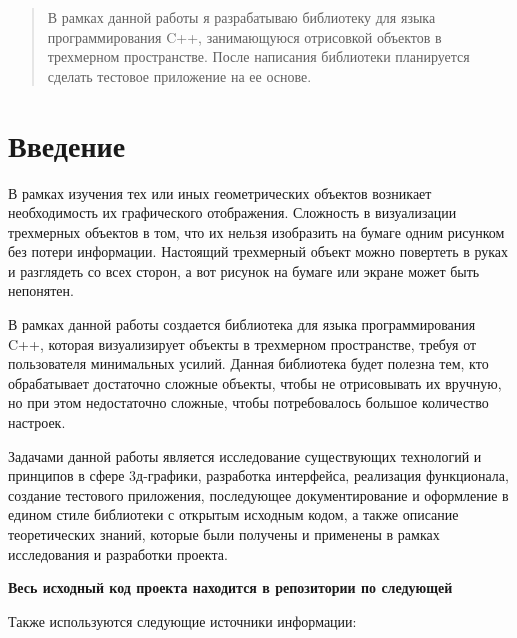 \documentclass{article}
\begin{document}
\makeTitlePage

\tableofcontents

\begin{abstract}
В рамках данной работы я разрабатываю библиотеку для языка программирования C++, занимающуюся отрисовкой объектов в трехмерном пространстве. После написания библиотеки планируется сделать тестовое приложение на ее основе.
\end{abstract}

\newpage

\section{Введение}

В рамках изучения тех или иных геометрических объектов возникает необходимость их графического отображения. Сложность в визуализации трехмерных объектов в том, что их нельзя изобразить на бумаге одним рисунком без потери информации. Настоящий трехмерный объект можно повертеть в руках и разглядеть со всех сторон, а вот рисунок на бумаге или экране может быть непонятен.

В рамках данной работы создается библиотека для языка программирования C++, которая визуализирует объекты в трехмерном пространстве, требуя от пользователя минимальных усилий. Данная библиотека будет полезна тем, кто обрабатывает достаточно сложные объекты, чтобы не отрисовывать их вручную, но при этом недостаточно сложные, чтобы потребовалось большое количество настроек.

Задачами данной работы является исследование существующих технологий и принципов в сфере 3д-графики, разработка интерфейса, реализация функционала, создание тестового приложения, последующее документирование и оформление в едином стиле библиотеки с открытым исходным кодом, а также описание теоретических знаний, которые были получены и применены в рамках исследования и разработки проекта.



\begin{center}\textbf{Весь исходный код проекта находится в репозитории по следующей \href{https://github.com/kik0s/3d-framework}{\color{blue}{ссылке}}} \end{center}

Также используются следующие источники информации:
\end{document}
